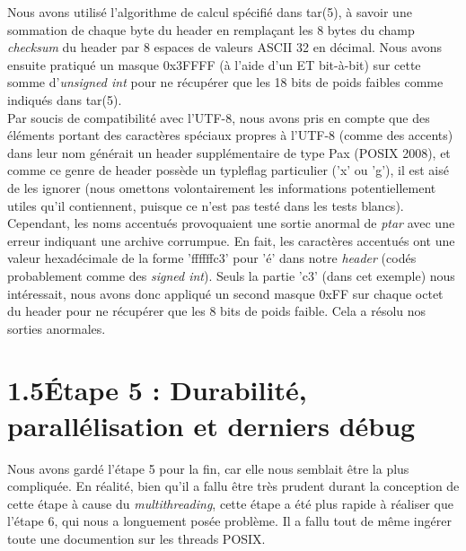 \documentclass[12pt, a4paper]{report}
\begin{document}
\hspace{0.5cm}Nous avons utilisé l'algorithme de calcul spécifié dans tar(5), à savoir une sommation de chaque byte du header en remplaçant les 8 bytes du champ \textit{checksum} du header par 8 espaces de valeurs ASCII 32 en décimal. Nous avons ensuite pratiqué un masque 0x3FFFF (à l'aide d'un ET bit-à-bit) sur cette somme d'\textit{unsigned int} pour ne récupérer que les 18 bits de poids faibles comme indiqués dans tar(5).\\

\hspace{0.5cm}Par soucis de compatibilité avec l'UTF-8, nous avons pris en compte que des éléments portant des caractères spéciaux propres à l'UTF-8 (comme des accents) dans leur nom générait un header supplémentaire de type Pax (POSIX 2008), et comme ce genre de header possède un typleflag particulier ('x' ou 'g'), il est aisé de les ignorer (nous omettons volontairement les informations potentiellement utiles qu'il contiennent, puisque ce n'est pas testé dans les tests blancs). Cependant, les noms accentués provoquaient une sortie anormal de \textit{ptar} avec une erreur indiquant une archive corrumpue. En fait, les caractères accentués ont une valeur hexadécimale de la forme 'ffffffc3' pour 'é' dans notre \textit{header} (codés probablement comme des \textit{signed int}). Seuls la partie 'c3' (dans cet exemple) nous intéressait, nous avons donc appliqué un second masque 0xFF sur chaque octet du header pour ne récupérer que les 8 bits de poids faible. Cela a résolu nos sorties anormales.

\section*{\hspace{0.6cm}1.5\hspace{0.6cm}Étape 5 : Durabilité, parallélisation et derniers débug}

\hspace{0.5cm}Nous avons gardé l'étape 5 pour la fin, car elle nous semblait être la plus compliquée. En réalité, bien qu'il a fallu être très prudent durant la conception de cette étape à cause du \textit{multithreading}, cette étape a été plus rapide à réaliser que l'étape 6, qui nous a longuement posée problème. Il a fallu tout de même ingérer toute une documention sur les threads POSIX.\\
\end{document}
